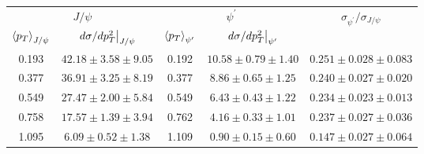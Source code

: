 \begin{tabular}{cc|cc|c}
\hline
\multicolumn{2}{c|}{$J/\psi$}                                 & \multicolumn{2}{c|}{$\psi^{\prime}$}                                 & \multirow{2}{*}{$\sigma_{\psi^\prime}/\sigma_{J/\psi}$} \\ \cline{1-4}
$\expval{p_T}_{J/\psi}$    & $\eval{d\sigma/dp^2_T}_{J/\psi}$ & $\expval{p_T}_{\psi^\prime}$ & $\eval{d\sigma/dp^2_T}_{\psi^\prime}$ &                                                         \\ \hline
\multicolumn{1}{c|}{0.193} & $42.18\pm3.58\pm9.05$            & \multicolumn{1}{c|}{0.192}   & $10.58\pm0.79\pm1.40$                 & $0.251\pm0.028\pm0.083$                                 \\
\multicolumn{1}{c|}{0.377} & $36.91\pm3.25\pm8.19$            & \multicolumn{1}{c|}{0.377}   & $8.86\pm0.65\pm1.25$                  & $0.240\pm0.027\pm0.020$                                 \\
\multicolumn{1}{c|}{0.549} & $27.47\pm2.00\pm5.84$            & \multicolumn{1}{c|}{0.549}   & $6.43\pm0.43\pm1.22$                  & $0.234\pm0.023\pm0.013$                                 \\
\multicolumn{1}{c|}{0.758} & $17.57\pm1.39\pm3.94$            & \multicolumn{1}{c|}{0.762}   & $4.16\pm0.33\pm1.01$                  & $0.237\pm0.027\pm0.036$                                 \\
\multicolumn{1}{c|}{1.095} & $6.09\pm0.52\pm1.38$             & \multicolumn{1}{c|}{1.109}   & $0.90\pm0.15\pm0.60$                  & $0.147\pm0.027\pm0.064$                                 \\ \hline
\end{tabular}
